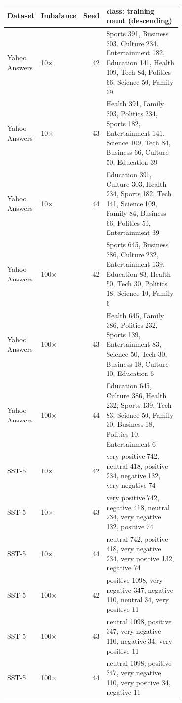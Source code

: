 \begin{tabular}{llrp{0.7\linewidth}}
\toprule
Dataset & Imbalance & Seed & class: training count (descending) \\
\midrule
Yahoo Answers & 10$\times$ & 42 & Sports 391, Business 303, Culture 234, Entertainment 182, Education 141, Health 109, Tech 84, Politics 66, Science 50, Family 39 \\
Yahoo Answers & 10$\times$ & 43 & Health 391, Family 303, Politics 234, Sports 182, Entertainment 141, Science 109, Tech 84, Business 66, Culture 50, Education 39 \\
Yahoo Answers & 10$\times$ & 44 & Education 391, Culture 303, Health 234, Sports 182, Tech 141, Science 109, Family 84, Business 66, Politics 50, Entertainment 39 \\
Yahoo Answers & 100$\times$ & 42 & Sports 645, Business 386, Culture 232, Entertainment 139, Education 83, Health 50, Tech 30, Politics 18, Science 10, Family 6 \\
Yahoo Answers & 100$\times$ & 43 & Health 645, Family 386, Politics 232, Sports 139, Entertainment 83, Science 50, Tech 30, Business 18, Culture 10, Education 6 \\
Yahoo Answers & 100$\times$ & 44 & Education 645, Culture 386, Health 232, Sports 139, Tech 83, Science 50, Family 30, Business 18, Politics 10, Entertainment 6 \\
SST-5 & 10$\times$ & 42 & very positive 742, neutral 418, positive 234, negative 132, very negative 74 \\
SST-5 & 10$\times$ & 43 & very positive 742, negative 418, neutral 234, very negative 132, positive 74 \\
SST-5 & 10$\times$ & 44 & neutral 742, positive 418, very negative 234, very positive 132, negative 74 \\
SST-5 & 100$\times$ & 42 & positive 1098, very negative 347, negative 110, neutral 34, very positive 11 \\
SST-5 & 100$\times$ & 43 & neutral 1098, positive 347, very negative 110, negative 34, very positive 11 \\
SST-5 & 100$\times$ & 44 & neutral 1098, positive 347, very negative 110, very positive 34, negative 11 \\
\bottomrule
\end{tabular}
